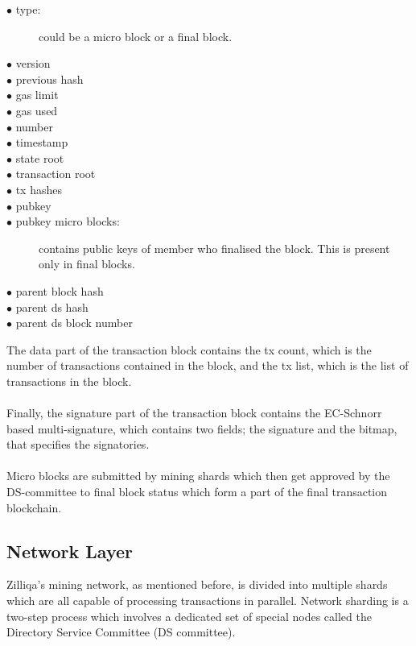 \documentclass[a4paper,twoside,phd]{BYUPhys}
\begin{document}
\begin{description}
\item[$\bullet$ type:] could be a micro block or a final block.
\item[$\bullet$ version] 
\item[$\bullet$ previous hash]
\item[$\bullet$ gas limit]
\item[$\bullet$ gas used]
\item[$\bullet$ number]
\item[$\bullet$ timestamp]
\item[$\bullet$ state root]
\item[$\bullet$ transaction root]
\item[$\bullet$ tx hashes]
\item[$\bullet$ pubkey]
\item[$\bullet$ pubkey micro blocks:] contains public keys of member who finalised the block. This is present only in final blocks.
\item[$\bullet$ parent block hash]
\item[$\bullet$ parent ds hash]
\item[$\bullet$ parent ds block number]
\end{description}
The data part of the transaction block contains the tx count, which is the number of transactions contained in the block, and the tx list, which is the list of transactions in the block\cite{TheZilliqaTeam2017TheWhitepaper}.
\\
\\
Finally, the signature part of the transaction block contains the EC-Schnorr based multi-signature, which contains two fields; the signature and the bitmap, that specifies the signatories\cite{TheZilliqaTeam2017TheWhitepaper}.  
\\
\\
Micro blocks are submitted by mining shards which then get approved by the DS-committee to final block status which form a part of the final transaction blockchain\cite{TheZilliqaTeam2017TheWhitepaper}.
\subsection{Network Layer}
 Zilliqa's mining network, as mentioned before, is divided into multiple shards which are all capable of processing transactions in parallel\cite{TheZilliqaTeam2017TheWhitepaper}. Network sharding is a two-step process which involves a dedicated set of special nodes called the Directory Service Committee (DS committee)\cite{TheZilliqaTeam2017TheWhitepaper}. 
\end{document}
